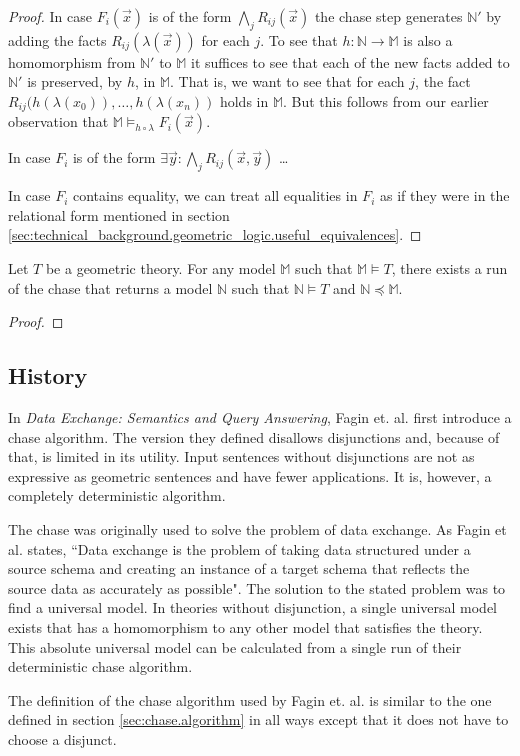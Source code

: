 \begin{proof}
			In case $F_i(\vec x)$ is of the form $\bigwedge_j R_{ij}(\vec x)$
			the chase step generates $\mathbb{N}'$ by adding the facts
			$R_{ij}(\lambda(\vec{x}))$ for each $j$. To see that $h :
			\mathbb{N} \to \mathbb{M}$ is also a homomorphism from
			$\mathbb{N}'$ to $\mathbb{M}$ it suffices to see that each of the
			new facts added to $\mathbb{N}'$ is preserved, by $h$, in
			$\mathbb{M}$. That is, we want to see that for each $j$, the fact
			$R_{ij}(h(\lambda(x_0)),\ldots,h(\lambda(x_n))$ holds in
			$\mathbb{M}$. But this follows from our earlier observation that
			$\mathbb{M} \models_{h\circ\lambda} F_i(\vec{x})$.

			In case $F_i$ is of the form $\exists \vec{y} : \bigwedge_j
			R_{ij}(\vec x,\vec y)$ \ldots

			In case $F_i$ contains equality, we can treat all equalities in
			$F_i$ as if they were in the relational form mentioned in section
			\ref{sec:technical_background.geometric_logic.useful_equivalences}.
		\end{proof}

		\begin{theorem}
			Let $T$ be a geometric theory. For any model $\mathbb{M}$ such that
			$\mathbb{M} \models T$, there exists a run of the chase that
			returns a model $\mathbb{N}$ such that $\mathbb{N} \models T$ and
			$\mathbb{N} \preceq \mathbb{M}$.

		\end{theorem}

		\begin{proof}
			
		\end{proof}

	\subsection{History}

		In \cite{FKMP02} \emph{Data Exchange: Semantics and Query Answering},
		Fagin et. al. first introduce a chase algorithm. The version they
		defined disallows disjunctions and, because of that, is limited in its
		utility. Input sentences without disjunctions are not as expressive
		as geometric sentences and have fewer applications. It is, however, a
		completely deterministic algorithm.

		The chase was originally used to solve the problem of data exchange. As
		Fagin et al. states, ``Data exchange is the problem of taking data
		structured under a source schema and creating an instance of a target
		schema that reflects the source data as accurately as possible". The
		solution to the stated problem was to find a universal model. In theories
		without disjunction, a single universal model exists that has a
		homomorphism to any other model that satisfies the theory. This
		absolute universal model can be calculated from a single run of their
		deterministic chase algorithm.

		The definition of the chase algorithm used by Fagin et. al. is similar
		to the one defined in section \ref{sec:chase.algorithm} in all ways
		except that it does not have to choose a disjunct.

